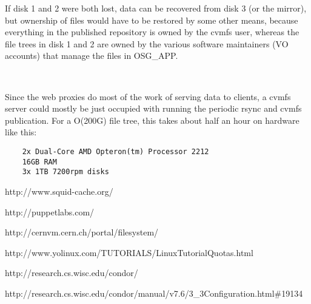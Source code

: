 \documentclass{article}
\begin{document}
If disk 1 and 2 were both lost, data can be recovered from disk 3 (or the mirror), 
but ownership of files would have to be restored by some other means, 
because everything in the published repository is owned by the cvmfs user, 
whereas the file trees in disk 1 and 2 are owned by the various software maintainers 
(VO accounts) that manage the files in OSG\_APP.

~

Since the web proxies do most of the work of serving data to clients, 
a cvmfs server could mostly be just occupied with running the periodic rsync and cvmfs publication.  
For a O(200G) file tree, this takes about half an hour on hardware like this:

\begin{verbatim}
    2x Dual-Core AMD Opteron(tm) Processor 2212
    16GB RAM
    3x 1TB 7200rpm disks
\end{verbatim}





\begin{thebibliography}{99}

    http://www.squid-cache.org/

    http://puppetlabs.com/    

    http://cernvm.cern.ch/portal/filesystem/      

    http://www.yolinux.com/TUTORIALS/LinuxTutorialQuotas.html

    http://research.cs.wisc.edu/condor/

    http://research.cs.wisc.edu/condor/manual/v7.6/3\_3Configuration.html\#19134

\end{thebibliography}
\end{document}

